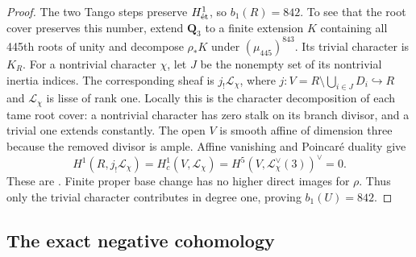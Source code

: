 \begin{proof}
The two Tango steps preserve $H^1_{\mathrm{\acute et}}$, so $b_1(R)=842$. To see that the root cover preserves this number, extend $\mathbf Q_3$ to a finite extension $K$ containing all 445th roots of unity and decompose $\rho_*K$ under $(\mu_{445})^{843}$. Its trivial character is $K_R$. For a nontrivial character $\chi$, let $J$ be the nonempty set of its nontrivial inertia indices. The corresponding sheaf is $j_!\mathcal L_\chi$, where $j:V=R\setminus\bigcup_{i\in J}D_i\hookrightarrow R$ and $\mathcal L_\chi$ is lisse of rank one. Locally this is the character decomposition of each tame root cover: a nontrivial character has zero stalk on its branch divisor, and a trivial one extends constantly. The open $V$ is smooth affine of dimension three because the removed divisor is ample. Affine vanishing and Poincaré duality give
\[
 H^1(R,j_!\mathcal L_\chi)=H_c^1(V,\mathcal L_\chi)
   =H^5(V,\mathcal L_\chi^\vee(3))^\vee=0.
\]
These are \citet[Exposé XIV, Theorem 3.1 and Corollary 3.2, p.~160; Exposé XVIII, Theorem 3.2.5 and (3.2.6.2), pp.~585--587]{SGA4}. Finite proper base change has no higher direct images for $\rho$. Thus only the trivial character contributes in degree one, proving $b_1(U)=842$.
\end{proof}

\subsection{The exact negative cohomology}

